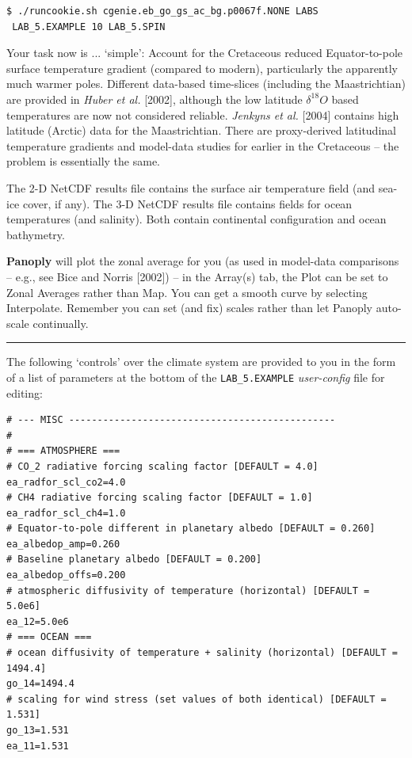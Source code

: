 \vspace{-2mm}\small\begin{verbatim}
$ ./runcookie.sh cgenie.eb_go_gs_ac_bg.p0067f.NONE LABS
 LAB_5.EXAMPLE 10 LAB_5.SPIN
\end{verbatim}\normalsize\vspace{-2mm}

Your task now is ... ‘simple’: Account for the Cretaceous reduced Equator-to-pole surface temperature gradient (compared to modern), particularly the apparently much warmer poles. Different data-based time-slices (including the Maastrichtian) are provided in \textit{Huber et al.} [2002], although the low latitude \(\delta^{18}O\) based temperatures are now not considered reliable. \textit{Jenkyns et al.} [2004] contains high latitude (Arctic) data for the Maastrichtian. There are proxy-derived latitudinal temperature gradients and model-data studies for earlier in the Cretaceous – the problem is essentially the same.

The 2-D NetCDF results file contains the surface air temperature field (and sea-ice cover, if any). The 3-D NetCDF results file contains fields for ocean temperatures (and salinity). Both contain continental configuration and ocean bathymetry.

\textbf{Panoply} will plot the zonal average for you (as used in model-data comparisons – e.g., see Bice and Norris [2002]) – in the Array(s) tab, the Plot can be set to Zonal Averages rather than Map. You can get a smooth curve by selecting Interpolate. Remember you can set (and fix) scales rather than let Panoply auto-scale continually.

\vspace{1mm}
\noindent\rule{4cm}{0.1mm}
\vspace{2mm}

\noindent The following ‘controls’ over the climate system are provided to you in the form of a list of parameters at the bottom of the \texttt{LAB\_5.EXAMPLE} \textit{user-config} file for editing:

\vspace{-1mm}\footnotesize\begin{verbatim}
# --- MISC -----------------------------------------------
#
# === ATMOSPHERE ===
# CO_2 radiative forcing scaling factor [DEFAULT = 4.0]
ea_radfor_scl_co2=4.0
# CH4 radiative forcing scaling factor [DEFAULT = 1.0]
ea_radfor_scl_ch4=1.0
# Equator-to-pole different in planetary albedo [DEFAULT = 0.260]
ea_albedop_amp=0.260
# Baseline planetary albedo [DEFAULT = 0.200]
ea_albedop_offs=0.200
# atmospheric diffusivity of temperature (horizontal) [DEFAULT = 5.0e6]
ea_12=5.0e6
# === OCEAN ===
# ocean diffusivity of temperature + salinity (horizontal) [DEFAULT = 1494.4]
go_14=1494.4
# scaling for wind stress (set values of both identical) [DEFAULT = 1.531]
go_13=1.531
ea_11=1.531
\end{verbatim}\normalsize\vspace{-1mm}

